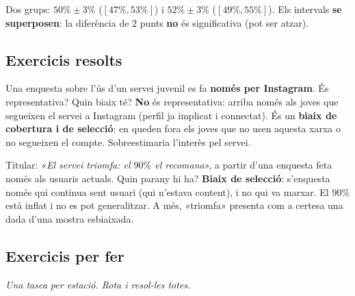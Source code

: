 \begin{exemple}
Dos grups: $50\%\pm 3\%$ ($[47\%,53\%]$) i $52\%\pm 3\%$ ($[49\%,55\%]$). Els intervals
\textbf{se superposen}: la diferència de $2$ punts \textbf{no} és significativa (pot ser
atzar).
\end{exemple}

\subsection{Exercicis resolts}

\begin{exresolt}
Una enquesta sobre l'ús d'un servei juvenil es fa \textbf{només per Instagram}. És
representativa? Quin biaix té?
\solucio
\textbf{No} és representativa: arriba només als joves que segueixen el servei a Instagram
(perfil ja implicat i connectat). És un \textbf{biaix de cobertura i de selecció}: en queden
fora els joves que no usen aquesta xarxa o no segueixen el compte. Sobreestimaria l'interès
pel servei.
\end{exresolt}

\begin{exresolt}
Titular: «\emph{El servei triomfa: el $90\%$ el recomana}», a partir d'una enquesta feta
només als usuaris actuals. Quin parany hi ha?
\solucio
\textbf{Biaix de selecció}: s'enquesta només qui continua sent usuari (qui n'estava content),
i no qui va marxar. El $90\%$ està inflat i no es pot generalitzar. A més, «triomfa» presenta
com a certesa una dada d'una mostra esbiaixada.
\end{exresolt}

\subsection{Exercicis per fer}

\noindent\textit{Una tasca per estació. Rota i resol-les totes.}

